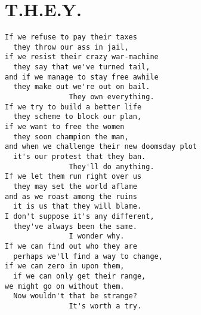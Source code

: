 \chapter{T.H.E.Y.}
\vspace{-0.5cm}
\vspace{-0.5cm}

\begin{verbatim}
If we refuse to pay their taxes
  they throw our ass in jail,
if we resist their crazy war-machine
  they say that we've turned tail,
and if we manage to stay free awhile
  they make out we're out on bail.
               They own everything.
If we try to build a better life
  they scheme to block our plan,
if we want to free the women
  they soon champion the man,
and when we challenge their new doomsday plot
  it's our protest that they ban.
               They'll do anything.
If we let them run right over us
  they may set the world aflame
and as we roast among the ruins
  it is us that they will blame.
I don't suppose it's any different,
  they've always been the same.
               I wonder why.
If we can find out who they are
  perhaps we'll find a way to change,
if we can zero in upon them,
  if we can only get their range,
we might go on without them.
  Now wouldn't that be strange?
               It's worth a try.
\end{verbatim}